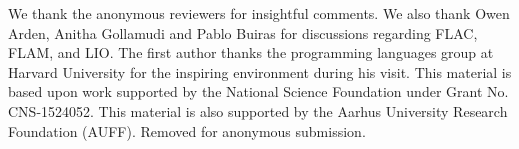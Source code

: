 \ifx\review\undefined
We thank the anonymous reviewers for insightful comments. We also thank Owen Arden, Anitha Gollamudi and Pablo Buiras for discussions regarding FLAC, FLAM, and LIO. The first author thanks the programming languages group at Harvard University for the inspiring environment during his visit. This material is based upon work supported by the National Science Foundation under Grant No. CNS-1524052. This material is also supported by the Aarhus University Research Foundation (AUFF).
\else
Removed for anonymous submission.
\fi